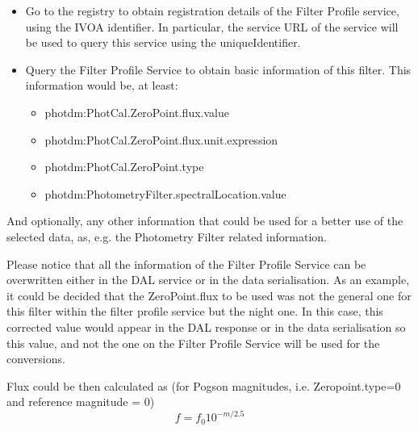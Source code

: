 \documentclass[11pt,a4paper]{ivoa}
\begin{document}
\begin{itemize}
	\item{Go to the registry to obtain registration details of the Filter Profile service,
	using the IVOA identifier. In particular, the service URL of the service will be used
	to query this service using the uniqueIdentifier.\par}

	\item{Query the Filter Profile Service to obtain basic information of this filter. This
	information would be, at least:\par}

\begin{itemize}
	\item photdm:PhotCal.ZeroPoint.flux.value\par

	\item photdm:PhotCal.ZeroPoint.flux.unit.expression\par

	\item photdm:PhotCal.ZeroPoint.type\par

	\item photdm:PhotometryFilter.spectralLocation.value
\end{itemize}
\end{itemize}\par

And optionally, any other information that could be used for a better use of the selected
data, as, e.g. the Photometry Filter related information.
\par

Please notice that all the information of the Filter Profile Service can be overwritten
either in the DAL service or in the data serialisation. As an example, it could be
decided that the ZeroPoint.flux to be used was not the general one for this filter
within the filter profile service but the night one. In this case, this corrected
value would appear in the DAL response or in the data serialisation so this value,
and not the one on the Filter Profile Service will be used for the conversions.
\par

Flux could be then calculated as (for Pogson magnitudes, i.e. Zeropoint.type=0 and
reference magnitude = 0)
\begin{equation} \label{eq:33}
f = f_0 10^{-m/2.5}
\end{equation}
\end{document}
